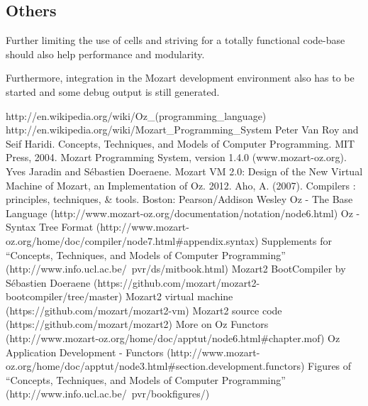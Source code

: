 \documentclass[a4paper]{memoir}
\begin{document}
\subsection{Others}

Further limiting the use of cells and striving for a totally functional code-base should also help 
performance and modularity.

Furthermore, integration in the Mozart development environment also has to be started and some debug output is still generated.

\begin{appendices} 


\begin{thebibliography}{1}
   http://en.wikipedia.org/wiki/Oz\_(programming\_language)
   http://en.wikipedia.org/wiki/Mozart\_Programming\_System
    Peter Van Roy and Seif Haridi.  Concepts, Techniques, and Models of Computer Programming. MIT Press, 2004.
   Mozart Programming System, version 1.4.0 (www.mozart-oz.org).
   Yves Jaradin and Sébastien Doeraene. Mozart VM 2.0: Design of the New Virtual Machine of Mozart, an Implementation of Oz. 2012.
   Aho, A. (2007). Compilers : principles, techniques, \& tools. Boston: Pearson/Addison Wesley
   Oz - The Base Language (http://www.mozart-oz.org/documentation/notation/node6.html)
   Oz - Syntax Tree Format (http://www.mozart-oz.org/home/doc/compiler/node7.html\#appendix.syntax)
   Supplements for ``Concepts, Techniques, and Models of Computer Programming'' (http://www.info.ucl.ac.be/~pvr/ds/mitbook.html)
   Mozart2 BootCompiler by S\'{e}bastien Doeraene (https://github.com/mozart/mozart2-bootcompiler/tree/master)
   Mozart2 virtual machine (https://github.com/mozart/mozart2-vm)
   Mozart2 source code (https://github.com/mozart/mozart2)
   More on Oz Functors (http://www.mozart-oz.org/home/doc/apptut/node6.html\#chapter.mof)
   Oz Application Development - Functors (http://www.mozart-oz.org/home/doc/apptut/node3.html\#section.development.functors)
   Figures of ``Concepts, Techniques, and Models of Computer Programming'' (http://www.info.ucl.ac.be/~pvr/bookfigures/)
\end{thebibliography}



\end{appendices}
\end{document}
